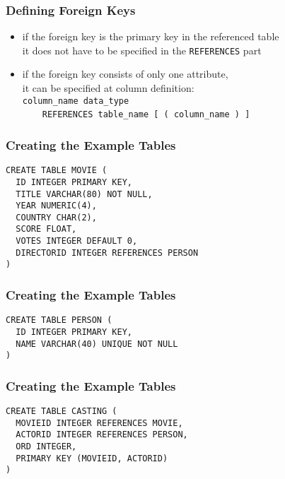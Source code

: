 \documentclass[dvipsnames]{beamer}
\theoremstyle{plain}
\begin{document}
\begin{frame}[fragile]
  \frametitle{Defining Foreign Keys}

  \begin{itemize}
    \item if the foreign key is the primary key in the referenced table\\
      it does not have to be specified in the \lstinline!REFERENCES! part

    \pause
    \item if the foreign key consists of only one attribute,\\
      it can be specified at column definition:\\
      \lstinline!column_name data_type!\\
      ~~~~\lstinline!REFERENCES table_name [ ( column_name ) ]!
  \end{itemize}
\end{frame}

\begin{frame}[fragile]
  \frametitle{Creating the Example Tables}

  \begin{example}
    \begin{lstlisting}
CREATE TABLE MOVIE (
  ID INTEGER PRIMARY KEY,
  TITLE VARCHAR(80) NOT NULL,
  YEAR NUMERIC(4),
  COUNTRY CHAR(2),
  SCORE FLOAT,
  VOTES INTEGER DEFAULT 0,
  DIRECTORID INTEGER REFERENCES PERSON
)
    \end{lstlisting}
  \end{example}
\end{frame}

\begin{frame}[fragile]
  \frametitle{Creating the Example Tables}

  \begin{example}
    \begin{lstlisting}
CREATE TABLE PERSON (
  ID INTEGER PRIMARY KEY,
  NAME VARCHAR(40) UNIQUE NOT NULL
)
    \end{lstlisting}
  \end{example}
\end{frame}

\begin{frame}[fragile]
  \frametitle{Creating the Example Tables}

  \begin{example}
    \begin{lstlisting}
CREATE TABLE CASTING (
  MOVIEID INTEGER REFERENCES MOVIE,
  ACTORID INTEGER REFERENCES PERSON,
  ORD INTEGER,
  PRIMARY KEY (MOVIEID, ACTORID)
)
    \end{lstlisting}
  \end{example}
\end{frame}
\end{document}
